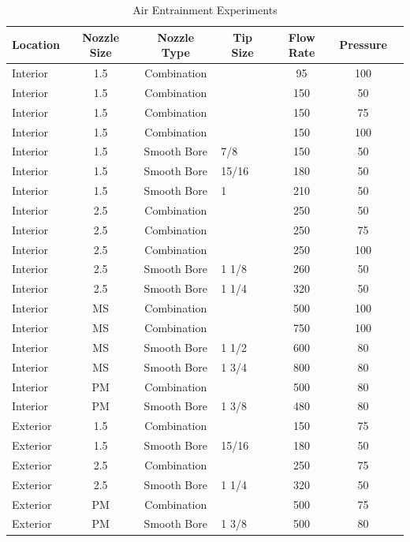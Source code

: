 \documentclass{article}
\begin{document}
\begin{table}[!ht]
\centering
\caption{Air Entrainment Experiments}\label{Total_Air_Entrainment_Experiments}
\begin{tabular}{lcclccc}
\toprule[1.5pt]
\multicolumn{1}{c}{\textbf{Location}} & \multicolumn{1}{c}{\textbf{Nozzle Size}} & \multicolumn{1}{c}{\textbf{Nozzle Type}} & \multicolumn{1}{c}{\textbf{Tip Size}} & \multicolumn{1}{c}{\textbf{Flow Rate}} & \textbf{Pressure} \\ 
\midrule
Interior & 1.5 & Combination &  & 95 & 100 \\
Interior & 1.5 & Combination &  & 150 & 50 \\
Interior & 1.5 & Combination &  & 150 & 75 \\
Interior & 1.5 & Combination &  & 150 & 100 \\
Interior & 1.5 & Smooth Bore & 7/8 & 150 & 50 \\
Interior & 1.5 & Smooth Bore & 15/16 & 180 & 50 \\
Interior & 1.5 & Smooth Bore & 1 & 210 & 50 \\
Interior & 2.5 & Combination &  & 250 & 50 \\
Interior & 2.5 & Combination &  & 250 & 75 \\
Interior & 2.5 & Combination &  & 250 & 100 \\
Interior & 2.5 & Smooth Bore & 1 1/8 & 260 & 50 \\
Interior & 2.5 & Smooth Bore & 1 1/4 & 320 & 50 \\
Interior & MS & Combination &  & 500 & 100 \\
Interior & MS & Combination &  & 750 & 100 \\
Interior & MS & Smooth Bore & 1 1/2 & 600 & 80 \\
Interior & MS & Smooth Bore & 1 3/4 & 800 & 80 \\
Interior & PM & Combination &  & 500 & 80 \\
Interior & PM & Smooth Bore & 1 3/8 & 480 & 80 \\
Exterior & 1.5 & Combination &  & 150 & 75 \\
Exterior & 1.5 & Smooth Bore & 15/16 & 180 & 50 \\
Exterior & 2.5 & Combination &  & 250 & 75 \\
Exterior & 2.5 & Smooth Bore & 1 1/4 & 320 & 50 \\
Exterior & PM & Combination &  & 500 & 75 \\
Exterior & PM & Smooth Bore & 1 3/8 & 500 & 80 \\ 
\bottomrule[1.25pt]
\end{tabular}
\end{table}
\end{document}
